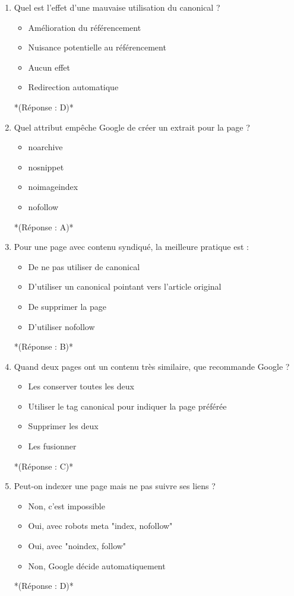\documentclass[12pt,a4paper,twoside]{report}
\begin{document}
\begin{enumerate}
\item Quel est l'effet d'une mauvaise utilisation du canonical ?
\begin{itemize}
\item[A)] Amélioration du référencement
\item[B)] Nuisance potentielle au référencement
\item[C)] Aucun effet
\item[D)] Redirection automatique
\end{itemize}
*(Réponse : D)*

\item Quel attribut empêche Google de créer un extrait pour la page ?
\begin{itemize}
\item[A)] noarchive
\item[B)] nosnippet
\item[C)] noimageindex
\item[D)] nofollow
\end{itemize}
*(Réponse : A)*

\item Pour une page avec contenu syndiqué, la meilleure pratique est :
\begin{itemize}
\item[A)] De ne pas utiliser de canonical
\item[B)] D'utiliser un canonical pointant vers l'article original
\item[C)] De supprimer la page
\item[D)] D'utiliser nofollow
\end{itemize}
*(Réponse : B)*

\item Quand deux pages ont un contenu très similaire, que recommande Google ?
\begin{itemize}
\item[A)] Les conserver toutes les deux
\item[B)] Utiliser le tag canonical pour indiquer la page préférée
\item[C)] Supprimer les deux
\item[D)] Les fusionner
\end{itemize}
*(Réponse : C)*

\item Peut-on indexer une page mais ne pas suivre ses liens ?
\begin{itemize}
\item[A)] Non, c'est impossible
\item[B)] Oui, avec robots meta "index, nofollow"
\item[C)] Oui, avec "noindex, follow"
\item[D)] Non, Google décide automatiquement
\end{itemize}
*(Réponse : D)*


\end{enumerate}
\end{document}

